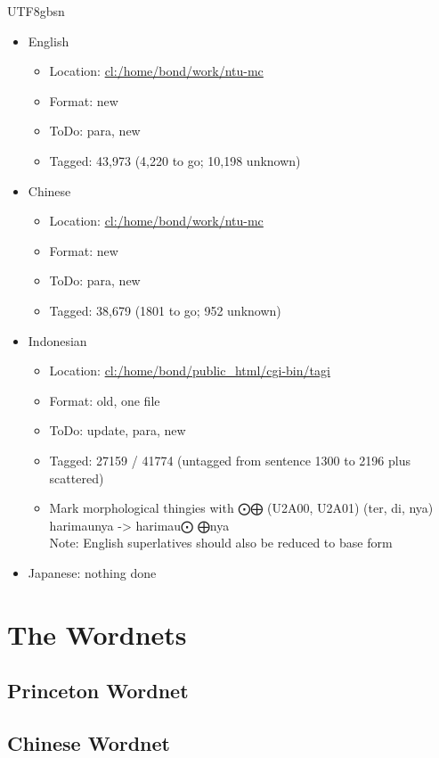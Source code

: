 \documentclass[12pt]{book} %
\begin{document}
\begin{CJK}{UTF8}{gbsn}
\begin{itemize}
\item English
  \begin{itemize}
  \item Location: \url{cl:/home/bond/work/ntu-mc}
  \item Format: new
  \item ToDo:  para, new
  \item Tagged: 43,973 (4,220 to go; 10,198 unknown)
  \end{itemize}
\item Chinese
  \begin{itemize}
  \item Location: \url{cl:/home/bond/work/ntu-mc}
  \item Format: new
  \item ToDo:  para, new
  \item Tagged: 38,679 (1801 to go; 952 unknown)
  \end{itemize}
\item Indonesian
  \begin{itemize}
  \item Location: \url{cl:/home/bond/public_html/cgi-bin/tagi}
  \item Format: old, one file
  \item ToDo: update, para, new
  \item Tagged: 27159 / 41774 (untagged from sentence 1300 to 2196 plus scattered)
  \item  Mark morphological thingies with ⨀⨁ (U2A00, U2A01) (ter, di, nya)
 \\ harimaunya -> harimau⨀ ⨁nya 
\\ Note: English superlatives should also be reduced to base form
  \end{itemize}
\item Japanese: nothing done 
\end{itemize}


\chapter{The Wordnets}

\section{Princeton Wordnet}

\section{Chinese Wordnet}


\end{CJK}
\end{document}
